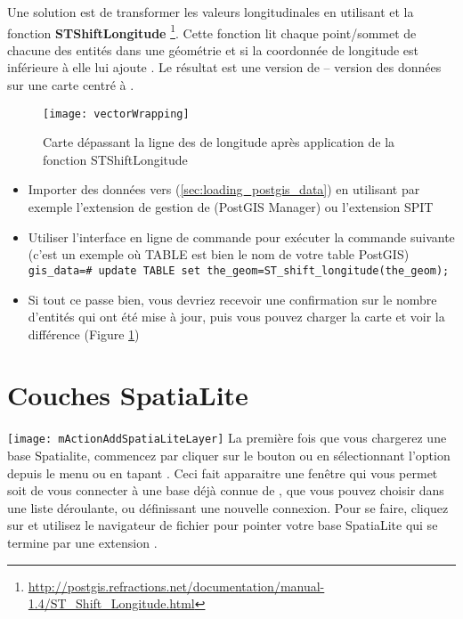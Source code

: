 Une solution est de transformer les valeurs longitudinales en utilisant \pg et la fonction \textbf{ST\textunderscore Shift\textunderscore Longitude}
\footnote{\url{http://postgis.refractions.net/documentation/manual-1.4/ST_Shift_Longitude.html}}. Cette fonction lit chaque point/sommet de chacune des entités dans une géométrie et si la coordonnée de longitude est inférieure à  elle lui ajoute . Le résultat est une version de  --  version des données sur une carte centré à .

\begin{figure}[ht]
   \begin{center}
   \texttt{[image: vectorWrapping]}
   \caption{Carte dépassant la ligne des  de longitude après application de la fonction ST\textunderscore Shift\textunderscore Longitude}
\label{fig:vector_wrapping}
\end{center}
\end{figure}


\begin{itemize}[label=--]
\item Importer des données vers \pg (\ref{sec:loading_postgis_data}) en utilisant par exemple l'extension de gestion de \pg (PostGIS Manager) ou l'extension SPIT
\item Utiliser l'interface en ligne de commande \pg pour exécuter la commande suivante (c'est un exemple où TABLE est bien le nom de votre table PostGIS) \\ 
\texttt{gis\_data=\# update TABLE set the\_geom=ST\_shift\_longitude(the\_geom);} 
\item Si tout ce passe bien, vous devriez recevoir une confirmation sur le nombre d'entités qui ont été mise à jour, puis vous pouvez charger la carte et voir la différence (Figure \ref{fig:vector_wrapping})
\end{itemize}

\section{Couches SpatiaLite} 
\label{label_spatialite} 

\texttt{[image: mActionAddSpatiaLiteLayer]}
La première fois que vous chargerez une base Spatialite, commencez par cliquer sur le bouton  ou en sélectionnant l'option\\  depuis le menu  ou en tapant . Ceci fait apparaitre une fenêtre qui vous permet soit de vous connecter à une base déjà connue de \qg, que vous pouvez choisir dans une liste déroulante, ou définissant une nouvelle connexion. Pour se faire, cliquez sur  et utilisez le navigateur de fichier pour pointer votre base SpatiaLite qui se termine par une extension .

